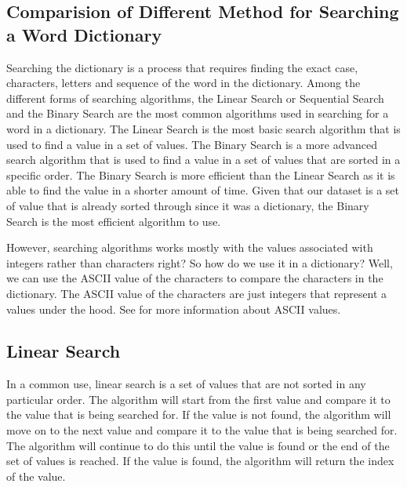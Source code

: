 \documentclass[11pt]{article}
\begin{document}
\begin{multicols*}{2}
    \subsection*{Comparision of Different Method for Searching a Word Dictionary}
    \par Searching the dictionary is a process that requires finding the exact case, characters, letters and sequence of the word in the dictionary. Among the different forms of searching algorithms, the Linear Search or Sequential Search and the Binary Search are the most common algorithms used in searching for a word in a dictionary. The Linear Search is the most basic search algorithm that is used to find a value in a set of values. The Binary Search is a more advanced search algorithm that is used to find a value in a set of values that are sorted in a specific order. The Binary Search is more efficient than the Linear Search as it is able to find the value in a shorter amount of time.\cite*{sorting_algorithm_comparison} Given that our dataset is a set of value that is already sorted through since it was a dictionary, the Binary Search is the most efficient algorithm to use. 
    \par However, searching algorithms works mostly with the values associated with integers rather than characters right? So how do we use it in a dictionary? Well, we can use the ASCII value of the characters to compare the characters in the dictionary. The ASCII value of the characters are just integers that represent a values under the hood. See \cite*{ascii_reference} for more information about ASCII values.
    \subsection*{Linear Search}
    \par In a common use, linear search is a set of values that are not sorted in any particular order. The algorithm will start from the first value and compare it to the value that is being searched for. If the value is not found, the algorithm will move on to the next value and compare it to the value that is being searched for. The algorithm will continue to do this until the value is found or the end of the set of values is reached. If the value is found, the algorithm will return the index of the value.

\end{multicols*}
\end{document}
